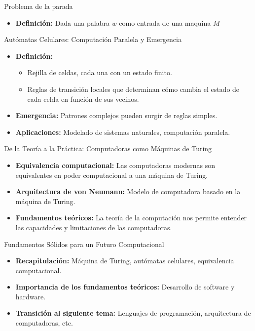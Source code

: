 \documentclass{beamer}
\begin{document}
		\begin{frame}{Problema de la parada}
		
		\begin{itemize}
			\item \textbf{Definición:} Dada	una	palabra $w$ como entrada de una maquina $M$
		\end{itemize}
	
	\begin{frame}{Autómatas Celulares: Computación Paralela y Emergencia}
		
		\begin{itemize}
			\item \textbf{Definición:} 
			\begin{itemize}
				\item Rejilla de celdas, cada una con un estado finito.
				\item Reglas de transición locales que determinan cómo cambia el estado de cada celda en función de sus vecinos.
			\end{itemize}
			\item \textbf{Emergencia:} Patrones complejos pueden surgir de reglas simples.
			\item \textbf{Aplicaciones:} Modelado de sistemas naturales, computación paralela.
		\end{itemize}
		
	\end{frame}
	
	\begin{frame}{De la Teoría a la Práctica: Computadoras como Máquinas de Turing}
		
		\begin{itemize}
			\item \textbf{Equivalencia computacional:} Las computadoras modernas son equivalentes en poder computacional a una máquina de Turing.
			\item \textbf{Arquitectura de von Neumann:} Modelo de computadora basado en la máquina de Turing.
			\item \textbf{Fundamentos teóricos:} La teoría de la computación nos permite entender las capacidades y limitaciones de las computadoras.
		\end{itemize}
		
	\end{frame}
	
	\begin{frame}{Fundamentos Sólidos para un Futuro Computacional}
		
		\begin{itemize}
			\item \textbf{Recapitulación:} Máquina de Turing, autómatas celulares, equivalencia computacional.
			\item \textbf{Importancia de los fundamentos teóricos:} Desarrollo de software y hardware.
			\item \textbf{Transición al siguiente tema:} Lenguajes de programación, arquitectura de computadoras, etc.
		\end{itemize}
		

\end{frame}
\end{frame}
\end{document}
